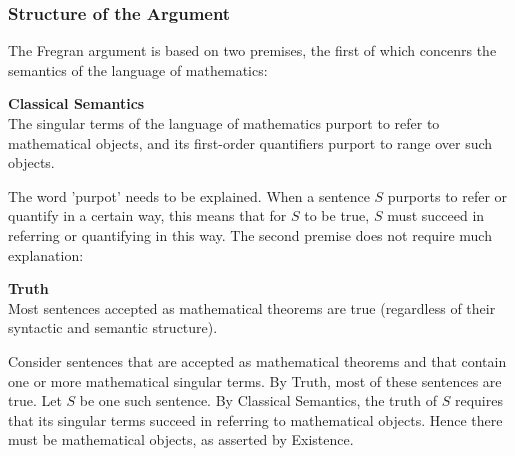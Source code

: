 \documentclass[10pt,a4paper]{article}
\newcounter{theo}
\begin{document}
                    \subsubsection{Structure of the Argument}
                        The Fregran argument is based on two premises, the first of which concenrs the semantics of the language of mathematics:
                        \begin{qt}
                            \textbf{Classical Semantics}
                            \\
                            The singular terms of the language of mathematics purport to refer to mathematical objects, and its first-order quantifiers purport to range over such objects.
                        \end{qt}
                        The word 'purpot' needs to be explained. When a sentence $S$ purports to refer or quantify in a certain way, this means that for $S$ to be true, $S$ must succeed in referring or quantifying in this way. The second premise does not require much explanation:
                        \begin{qt}
                            \textbf{Truth}
                            \\
                            Most sentences accepted as mathematical theorems are true (regardless of their syntactic and semantic structure).
                        \end{qt}
                        Consider sentences that are accepted as mathematical theorems and that contain one or more mathematical singular terms. By Truth, most of these sentences are true. Let $S$ be one such sentence. By Classical Semantics, the truth of $S$ requires that its singular terms succeed in referring to mathematical objects. Hence there must be mathematical objects, as asserted by Existence.
\end{document}
